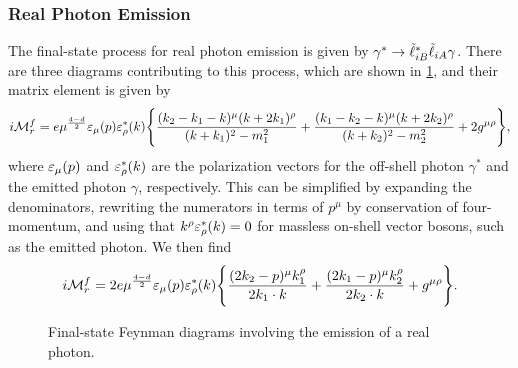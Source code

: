 \subsubsection{Real Photon Emission}

The final-state process for real photon emission is given by $\gamma^*\to{\tilde{\ell}}_{iB}^*{\tilde{\ell}}_{iA}\gamma$.
There are three diagrams contributing to this process, which are shown in \cref{fig:fs_real}, and their matrix element is given by
\begin{equation}
    i\mathcal{M}^f_r = e\mu^{\frac{4-d}{2}}\varepsilon_\mu(p)\varepsilon_\rho^*(k) \Biggl\{
        \frac{(k_2-k_1-k)^\mu (k+2k_1)^\rho}{(k+k_1)^2-m_1^2}
        + \frac{(k_1-k_2-k)^\mu (k+2k_2)^\rho}{(k+k_2)^2-m_2^2}
        + 2g^{\mu\rho}
    \Biggr\},
\end{equation}
where $\varepsilon_\mu(p)$ and $\varepsilon_\rho^*(k)$ are the polarization vectors for the off-shell photon $\gamma^*$ and the emitted photon $\gamma$, respectively.
This can be simplified by expanding the denominators, rewriting the numerators in terms of $p^\mu$ by conservation of four-momentum, and using that $k^\rho\varepsilon_\rho^*(k)=0$ for massless on-shell vector bosons, such as the emitted photon. We then find
\begin{equation}
    i\mathcal{M}^f_r = 2e\mu^{\frac{4-d}{2}}\varepsilon_\mu(p)\varepsilon_\rho^*(k) \Biggl\{
        \frac{(2k_2-p)^\mu k_1^\rho}{2k_1\cdot k}
        + \frac{(2k_1-p)^\mu k_2^\rho}{2k_2\cdot k}
        + g^{\mu\rho}
    \Biggr\}.
    \label{eq:Mf_emis}
\end{equation}

\begin{figure}[t]
    \centering
    \begin{subfigure}[b]{0.32\linewidth}
        \centering
    \end{subfigure}
    \begin{subfigure}[b]{0.32\linewidth}
        \centering
    \end{subfigure}
    \begin{subfigure}[b]{0.32\linewidth}
        \centering
    \end{subfigure}
    \caption{Final-state Feynman diagrams involving the emission of a real photon.}
    \label{fig:fs_real}
\end{figure}

